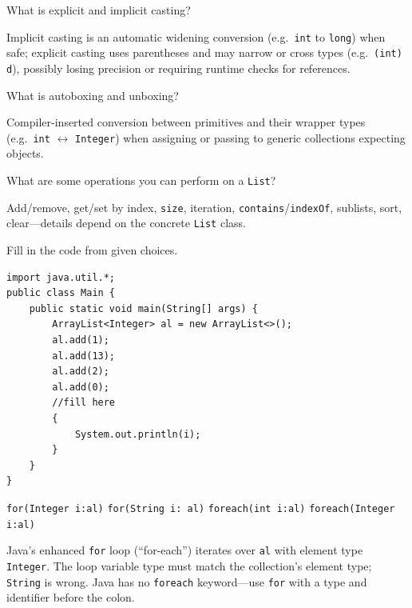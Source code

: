 \question[4]
What is explicit and implicit casting?
\begin{solutionorbox}[1.25in]
  Implicit casting is an automatic widening conversion (e.g.\ \texttt{int} to \texttt{long}) when safe; explicit casting uses parentheses and may narrow or cross types (e.g.\ \texttt{(int) d}), possibly losing precision or requiring runtime checks for references.
\end{solutionorbox}

\question[4]
What is autoboxing and unboxing?
\begin{solutionorbox}[1.2in]
  Compiler-inserted conversion between primitives and their wrapper types (e.g.\ \texttt{int} \(\leftrightarrow\) \texttt{Integer}) when assigning or passing to generic collections expecting objects.
\end{solutionorbox}

\question[4]
What are some operations you can perform on a \texttt{List}?
\begin{solutionorbox}[1.35in]
  Add/remove, get/set by index, \texttt{size}, iteration, \texttt{contains}/\texttt{indexOf}, sublists, sort, clear---details depend on the concrete \texttt{List} class.
\end{solutionorbox}

\newpage


\question[4]
Fill in the code from given choices.
\begin{lstlisting}[style=java]
import java.util.*;
public class Main {
    public static void main(String[] args) {
        ArrayList<Integer> al = new ArrayList<>();
        al.add(1);
        al.add(13);
        al.add(2);
        al.add(0);
        //fill here
        {
            System.out.println(i);
        }
    }
}
\end{lstlisting}
\begin{choices}
  \CorrectChoice \texttt{for(Integer i:al)}
  \choice \texttt{for(String i: al)}
  \choice \texttt{foreach(int i:al)}
  \choice \texttt{foreach(Integer i:al)}
\end{choices}
\begin{solution}
  Java's enhanced \texttt{for} loop (``for-each'') iterates over \texttt{al} with element type \texttt{Integer}. The loop variable type must match the collection's element type; \texttt{String} is wrong. Java has no \texttt{foreach} keyword---use \texttt{for} with a type and identifier before the colon.
\end{solution}

